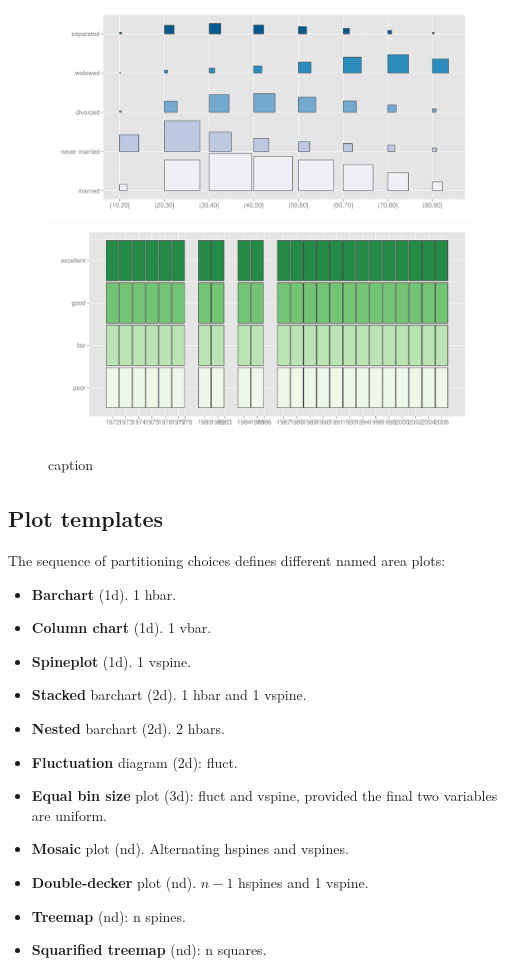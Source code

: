 \documentclass[letterpaper,oneside]{scrartcl}
\begin{document}
\begin{figure}[htbp]
  \centering
    \includegraphics[width=0.5\linewidth]{part-fluct}%
    \includegraphics[width=0.5\linewidth]{part-fluct-cond}
  \caption{caption}
  \label{fig:fluct}
\end{figure}

\subsection{Plot templates}

The sequence of partitioning choices defines different named area plots:

\begin{itemize}
  \item {\bf Barchart} (1d). 1 hbar.
  \item {\bf Column chart} (1d). 1 vbar.
  \item {\bf Spineplot} (1d). 1 vspine.

  \item {\bf Stacked} barchart (2d). 1 hbar and 1 vspine.
  \item {\bf Nested} barchart (2d).  2 hbars. \citep{peltier:2009}
  \item {\bf Fluctuation} diagram (2d): fluct. 

  \item {\bf Equal bin size} plot (3d): fluct and vspine, provided the final two variables are uniform.

  \item {\bf Mosaic} plot (nd).  Alternating hspines and vspines.  \citep{hartigan:1984,hartigan:1981,friendly:1994,hofmann:2003}
  \item {\bf Double-decker} plot (nd).  $n-1$ hspines and 1 vspine. \citep{hofmann:2001}
  \item {\bf Treemap} (nd): n spines. \citep{shneiderman:1992}
  \item {\bf Squarified treemap} (nd): n squares. \citep{bruls:1999}
  
\end{itemize}
\end{document}
